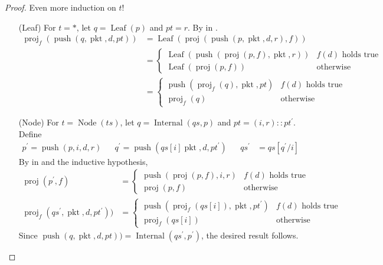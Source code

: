 \documentclass{amsart}
\DeclareMathOperator{\pkt}{\mathrm{pkt}}
\DeclareMathOperator{\push}{\mathrm{push}}
\DeclareMathOperator{\proj}{\mathrm{proj}}
\DeclareMathOperator{\Leaf}{\mathrm{Leaf}}
\DeclareMathOperator{\Internal}{\mathrm{Internal}}
\DeclareMathOperator{\Node}{\mathrm{Node}}
\theoremstyle{definition}
\begin{document}
\begin{proof}
    Even more induction on $t$!
    \begin{itemize}
        \item[(Leaf)] For $t = \ast$, let $q = \Leaf(p)$ and $pt = r$.
            By  in .
            \begin{align*}
                \proj_f(\push(q,\pkt, d, pt)) &= \Leaf(\proj(\push(p, \pkt, d, r), f)) \\
                                              &=
                \begin{cases}
                    \Leaf(\push(\proj(p, f), \pkt, r)) & f(d) \text{ holds true}\\
                    \Leaf(\proj(p, f)) & \text{otherwise}
                \end{cases}\\
                                              &= 
                \begin{cases}
                    \push(\proj_f(q), \pkt, pt) & f(d) \text{ holds true}\\
                    \proj_f(q) & \text{otherwise}
                \end{cases}
            \end{align*}
        \item[(Node)] For $t = \Node(ts)$, let $q = \Internal(qs, p)$ and $pt = (i, r) :: pt^\prime$.
            Define
            \begin{align*}
                p^\prime = \push(p, i, d, r) &&
                q^\prime = \push(qs[i] \pkt, d, pt^\prime) &&
                qs^\prime &= qs[q^\prime/i]
            \end{align*}
            By  in  and the inductive hypothesis,
            \begin{align*}
                \proj(p^\prime, f) &= 
                \begin{cases}
                    \push(\proj(p, f), i, r) & f(d) \text{ holds true}\\
                    \proj(p, f) & \text{otherwise}
                \end{cases}\\
                \proj_f(qs^\prime, \pkt, d, pt^\prime)) &= 
                \begin{cases}
                    \push(\proj_f(qs[i]), \pkt, pt^\prime) & f(d) \text{ holds true}\\
                    \proj_f(qs[i]) & \text{otherwise}
                \end{cases}
            \end{align*}
            Since $\push(q, \pkt, d, pt)) = \Internal(qs^\prime, p^\prime)$, the desired result follows.
    \end{itemize}
\end{proof}
\end{document}
